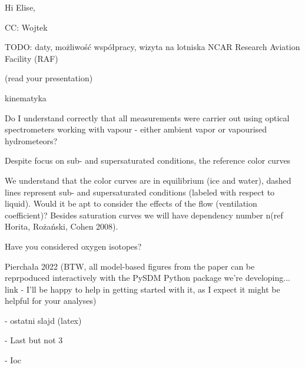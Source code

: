 Hi Elise,

CC: Wojtek

TODO: daty, możliwość współpracy, wizyta na lotniska NCAR Research Aviation Facility (RAF)


(read your presentation)

kinematyka

Do I understand correctly that all measurements were carrier out using optical spectrometers working with vapour - either ambient vapor or vapourised hydrometeors?

Despite focus on sub- and supersaturated conditions, the reference color curves

We understand that the color curves are in equilibrium (ice and water), dashed lines represent sub- and supersaturated conditions (labeled with respect to liquid). Would it be apt to consider the effects of the flow (ventilation coefficient)? Besides saturation curves we will have dependency  number n(ref Horita,  Rożański, Cohen 2008).

Have you considered oxygen isotopes?

Pierchała 2022 (BTW, all model-based figures from the paper can be reprpoduced interactively with the PySDM Python package we're developing... link - I'll be happy to help in getting started with it, as I expect it might be helpful for your analyses)

- ostatni slajd (latex)

- Last but not 3%


- Ioc